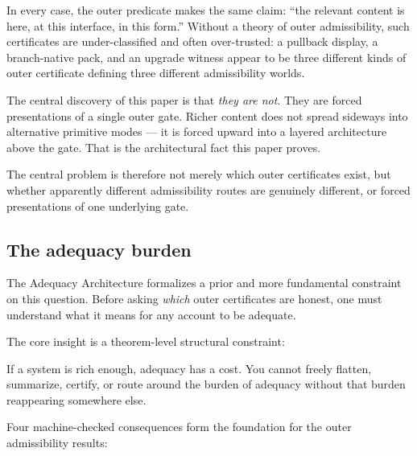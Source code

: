 \documentclass[11pt]{article}
\theoremstyle{plain}
\theoremstyle{definition}
\theoremstyle{remark}
\begin{document}
In every case, the outer predicate makes the same claim: ``the relevant
content is here, at this interface, in this form.''  Without a theory of
outer admissibility, such certificates are under-classified and often
over-trusted: a pullback display, a branch-native pack, and an upgrade
witness appear to be three different kinds of outer certificate defining
three different admissibility worlds.

The central discovery of this paper is that \emph{they are not}.  They are
forced presentations of a single outer gate.  Richer content does not
spread sideways into alternative primitive modes --- it is forced upward
into a layered architecture above the gate.  That is the architectural
fact this paper proves.

The central problem is therefore not merely which outer certificates exist,
but whether apparently different admissibility routes are genuinely
different, or forced presentations of one underlying gate.

\subsection{The adequacy burden}

The Adequacy Architecture formalizes a prior and more fundamental constraint
on this question.  Before asking \emph{which} outer certificates are honest,
one must understand what it means for any account to be adequate.

The core insight is a theorem-level structural constraint:

\begin{keybox}[title=The fundamental theorem (informal)]
  If a system is rich enough, adequacy has a cost.  You cannot freely
  flatten, summarize, certify, or route around the burden of adequacy
  without that burden reappearing somewhere else.
\end{keybox}

Four machine-checked consequences form the foundation for the outer
admissibility results:
\end{document}
